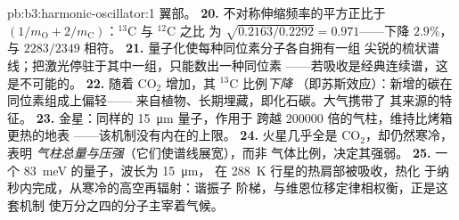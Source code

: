 \begin{solution}{pb:b3:harmonic-oscillator:1}
翼部。
\textbf{20.} 不对称伸缩频率的平方正比于 $(1/m_{
\text{O}} + 2/m_{\text{C}})$：$^{13}$C 与 $^{12}$C 之比
为 $\sqrt{0.2163/0.2292} = 0.971$——下降 $2.9\%$，与
$2283/2349$ 相符。
\textbf{21.} 量子化使每种同位素分子各自拥有一组
尖锐的梳状谱线；把激光停驻于其中一组，只能数出一种同位素
——若吸收是经典连续谱，这是不可能的。
\textbf{22.} 随着 CO$_2$ 增加，其 $^{13}$C 比例\emph{下降}
（即苏斯效应）：新增的碳在同位素组成上偏轻——
来自植物、长期埋藏，即化石碳。大气携带了
其来源的特征。
\textbf{23.} 金星：同样的 \qty{15}{\micro m} 量子，作用于
跨越 $200000$ 倍的气柱，维持比烤箱更热的地表
——该机制没有内在的上限。
\textbf{24.} 火星几乎全是 CO$_2$，却仍然寒冷，表明
\emph{气柱总量与压强}（它们使谱线展宽），而非
气体比例，决定其强弱。
\textbf{25.} 一个 \qty{83}{meV} 的量子，波长为 \qty{15}{\micro m}，
在 \qty{288}{K} 行星的热肩部被吸收，热化
于纳秒内完成，从寒冷的高空再辐射：谐振子
阶梯，与维恩位移定律相权衡，正是这套机制
使万分之四的分子主宰着气候。
\end{solution}
